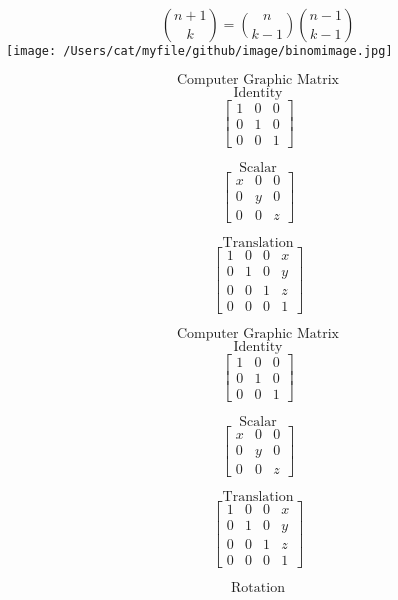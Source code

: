 \documentclass[10pt]{article}
\begin{document}
\newpage
\[  \binom{n+1}{k} = \binom{n}{k-1} \binom{n-1}{k-1} \] 
\texttt{[image: /Users/cat/myfile/github/image/binomimage.jpg]}

\newpage
\[\text{Computer Graphic Matrix} \]
\[\text{Identity}\]
\[
        \begin{bmatrix}
            1 & 0 & 0\\
            0 & 1 & 0\\   
            0 & 0 & 1  
        \end{bmatrix}
\]

\[ \text{Scalar} \]
\[
        \begin{bmatrix}
            x & 0 & 0\\
            0 & y & 0\\   
            0 & 0 & z  
        \end{bmatrix}
\]

\[ \text{Translation} \]
\[
        \begin{bmatrix}
            1 & 0 & 0 & x\\
            0 & 1 & 0 & y\\   
            0 & 0 & 1 & z\\  
            0 & 0 & 0 & 1  
        \end{bmatrix}
\]

\newpage
\[\text{Computer Graphic Matrix} \]
\[\text{Identity}\]
\[
        \begin{bmatrix}
            1 & 0 & 0\\
            0 & 1 & 0\\   
            0 & 0 & 1  
        \end{bmatrix}
\]

\[ \text{Scalar} \]
\[
        \begin{bmatrix}
            x & 0 & 0\\
            0 & y & 0\\   
            0 & 0 & z  
        \end{bmatrix}
\]

\[ \text{Translation} \]
\[
        \begin{bmatrix}
            1 & 0 & 0 & x\\
            0 & 1 & 0 & y\\   
            0 & 0 & 1 & z\\  
            0 & 0 & 0 & 1  
        \end{bmatrix}
\]

\[ \text{Rotation} \]
\end{document}

